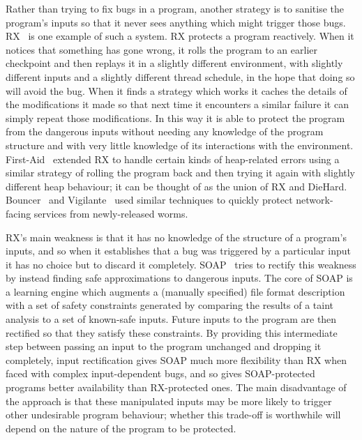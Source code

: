Rather than trying to fix bugs in a program, another strategy is to
sanitise the program's inputs so that it never sees anything which
might trigger those bugs.  RX~\cite{Qin2007} is one example of such a
system.  RX protects a program reactively.  When it notices that
something has gone wrong, it rolls the program to an earlier
checkpoint and then replays it in a slightly different environment,
with slightly different inputs and a slightly different thread
schedule, in the hope that doing so will avoid the bug.  When it finds
a strategy which works it caches the details of the modifications it
made so that next time it encounters a similar failure it can simply
repeat those modifications.  In this way it is able to protect the
program from the dangerous inputs without needing any knowledge of the
program structure and with very little knowledge of its interactions
with the environment.  First-Aid~\cite{Gao2009} extended RX to handle
certain kinds of heap-related errors using a similar strategy of
rolling the program back and then trying it again with slightly
different heap behaviour; it can be thought of as the union of RX and
DieHard.  Bouncer~\cite{Costa2007} and Vigilante~\cite{Costa2008} used
similar techniques to quickly protect network-facing services from
newly-released worms.

RX's main weakness is that it has no knowledge of the structure of a
program's inputs, and so when it establishes that a bug was triggered
by a particular input it has no choice but to discard it completely.
SOAP~\cite{Long2012} tries to rectify this weakness by instead finding
safe approximations to dangerous inputs.  The core of SOAP is a
learning engine which augments a (manually specified) file format
description with a set of safety constraints generated by comparing
the results of a taint analysis to a set of known-safe inputs.  Future
inputs to the program are then rectified so that they satisfy these
constraints.  By providing this intermediate step between passing an
input to the program unchanged and dropping it completely, input
rectification gives SOAP much more flexibility than RX when faced with
complex input-dependent bugs, and so gives SOAP-protected programs
better availability than RX-protected ones.  The main disadvantage of
the approach is that these manipulated inputs may be more likely to
trigger other undesirable program behaviour; whether this trade-off is
worthwhile will depend on the nature of the program to be protected.

